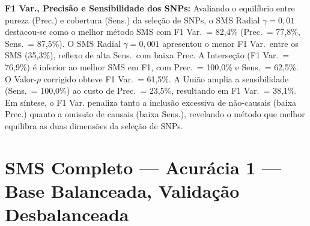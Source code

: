 \documentclass[
    12pt,
    a4paper,
    oneside,
    english,
    french,
    spanish,
    brazil
    ]{abntex2}
\newcommand{\novo}[1]{\textcolor{corNova}{#1}}
\begin{document}
\novo{\textbf{F1 Var., Precisão e Sensibilidade dos SNPs:} Avaliando o equilíbrio entre pureza (Prec.) e cobertura (Sens.) da seleção de SNPs, o SMS Radial $\gamma=0{,}01$ destacou-se como o melhor método SMS com F1 Var.\ = 82,4\% (Prec.\ = 77,8\%, Sens.\ = 87,5\%). O SMS Radial $\gamma=0{,}001$ apresentou o menor F1 Var.\ entre os SMS (35,3\%), reflexo de alta Sens.\ com baixa Prec. A Interseção (F1 Var.\ = 76,9\%) é inferior ao melhor SMS em F1, com Prec.\ = 100,0\% e Sens.\ = 62,5\%. O Valor-$p$ corrigido obteve F1 Var.\ = 61,5\%. A União amplia a sensibilidade (Sens.\ = 100,0\%) ao custo de Prec.\ = 23,5\%, resultando em F1 Var.\ = 38,1\%. Em síntese, o F1 Var. penaliza tanto a inclusão excessiva de não-causais (baixa Prec.) quanto a omissão de causais (baixa Sens.), revelando o método que melhor equilibra as duas dimensões da seleção de SNPs.}
\section{SMS Completo --- Acurácia 1 --- Base Balanceada, Validação Desbalanceada}
\end{document}
